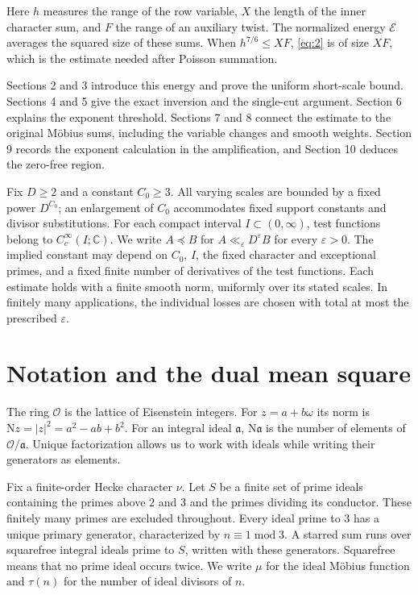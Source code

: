\documentclass[reqno,a4paper,11pt]{amsart}
\begin{document}
Here $h$ measures the range of the row variable, $X$ the length of the inner character sum, and $F$ the range of an auxiliary twist. The normalized energy $\mathcal{E}$ averages the squared size of these sums. When $h^{7/6}\le XF$, \eqref{eq:2} is of size $XF$, which is the estimate needed after Poisson summation.

Sections 2 and 3 introduce this energy and prove the uniform short-scale bound. Sections 4 and 5 give the exact inversion and the single-cut argument. Section 6 explains the exponent threshold. Sections 7 and 8 connect the estimate to the original Möbius sums, including the variable changes and smooth weights. Section 9 records the exponent calculation in the amplification, and Section 10 deduces the zero-free region.

Fix $D\ge 2$ and a constant ${C}_{0}\ge 3$. All varying scales are bounded by a fixed power ${D}^{{C}_{0}}$; an enlargement of ${C}_{0}$ accommodates fixed support constants and divisor substitutions. For each compact interval $I\subset (0,\infty )$, test functions belong to ${C}_{c}^{\infty }(I;\mathbb{C})$. We write $A\preccurlyeq B$ for $A{\ll }_{\varepsilon }{D}^{\varepsilon }B$ for every $\varepsilon >0$. The implied constant may depend on ${C}_{0}$, $I$, the fixed character and exceptional primes, and a fixed finite number of derivatives of the test functions. Each estimate holds with a finite smooth norm, uniformly over its stated scales. In finitely many applications, the individual losses are chosen with total at most the prescribed $\varepsilon $.

\section{Notation and the dual mean square}

The ring $\mathcal{O}$ is the lattice of Eisenstein integers. For $z=a+b\omega$ its norm is $\mathrm{N}z=|z|^2=a^2-ab+b^2$. For an integral ideal $\mathfrak{a}$, $\mathrm{N}\mathfrak{a}$ is the number of elements of $\mathcal{O}/\mathfrak{a}$. Unique factorization allows us to work with ideals while writing their generators as elements.

Fix a finite-order Hecke character $\nu$. Let $S$ be a finite set of prime ideals containing the primes above $2$ and $3$ and the primes dividing its conductor. These finitely many primes are excluded throughout. Every ideal prime to $3$ has a unique primary generator, characterized by $n\equiv1\;\mathrm{mod}\;3$. A starred sum runs over squarefree integral ideals prime to $S$, written with these generators. Squarefree means that no prime ideal occurs twice. We write $\mu$ for the ideal Möbius function and $\tau(n)$ for the number of ideal divisors of $n$.
\end{document}
